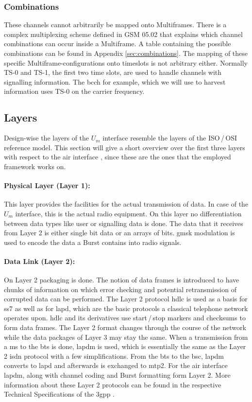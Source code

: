 \subsubsection{Combinations}
These channels cannot arbitrarily be mapped onto Multiframes.
There is a complex multiplexing scheme defined in GSM 05.02 \cite{gsm0502} that explains which channel combinations can occur inside a Multiframe.
A table containing the possible combinations can be found in Appendix \ref{sec:combinations}.
The mapping of these specific Multiframe-configurations onto timeslots is not arbitrary either.
Normally TS-0 and TS-1, the first two time slots, are used to handle channels with signalling information.
The \gls{bcch} for example, which we will use to harvest information uses TS-0 on the carrier frequency.

\subsection{Layers}
\label{sec:layers}
Design-wise the layers of the $U_m$ interface resemble the layers of the ISO\,/\,OSI reference model.
This section will give a short overview over the first three layers with respect to the air interface \cite{protocols1999}, since these are the ones that the employed framework works on.

\paragraph{Physical Layer (Layer 1):} This layer provides the facilities for the actual transmission of data.
In case of the $U_m$ interface, this is the actual radio equipment.
On this layer no differentiation between data types like user or signalling data is done.
The data that it receives from Layer 2 is either single bit data or an arrays of bits.
\gls{gmsk} modulation is used to encode the data a Burst contains into radio signals.

\paragraph{Data Link (Layer 2):} On Layer 2 packaging is done.
The notion of data frames is introduced to have chunks of information on which error checking and potential retransmission of corrupted data can be performed.
The Layer 2 protocol \gls{hdlc} is used as a basis for \gls{ss7} as well as for \gls{lapd}, which are the basic protocols a classical telephone network operates upon.
\gls{hdlc} and its derivatives use start\,/\,stop markers and checksums to form data frames.
The Layer 2 format changes through the course of the network while the data packages of Layer 3 may stay the same.
When a transmission from a \gls{ms} to the \gls{bts} is done, \gls{lapdm} is used, which is essentially the same as the Layer 2 \gls{isdn} protocol with a few simplifications.
From the \gls{bts} to the \gls{bsc}, \gls{lapdm} converts to \gls{lapd} and afterwards is exchanged to \gls{mtp2}.
For the air interface \gls{lapdm}, along with channel coding and Burst formatting form Layer 2.
More information about these Layer 2 protocols can be found in the respective Technical Specifications of the \gls{3gpp} \cite{GSM0405,GSM0406}.


